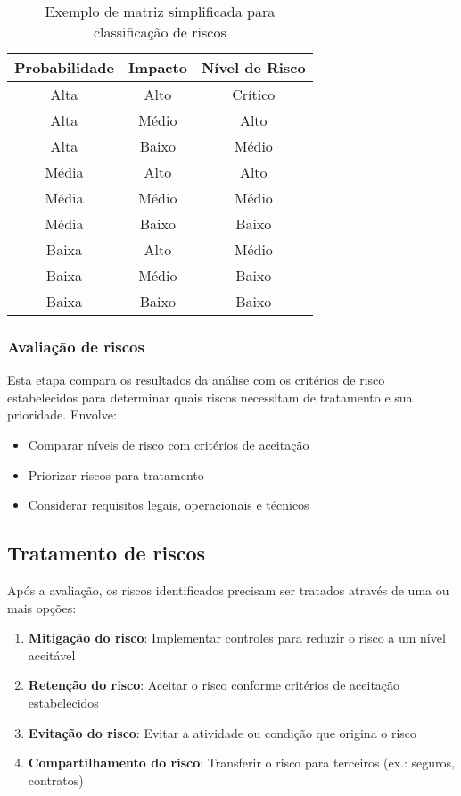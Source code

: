 \documentclass[12pt,a4paper]{report}
\begin{document}
\begin{table}[h]
\centering
\begin{tabular}{ccc}
\toprule
\textbf{Probabilidade} & \textbf{Impacto} & \textbf{Nível de Risco} \\
\midrule
Alta & Alto & Crítico \\
Alta & Médio & Alto \\
Alta & Baixo & Médio \\
Média & Alto & Alto \\
Média & Médio & Médio \\
Média & Baixo & Baixo \\
Baixa & Alto & Médio \\
Baixa & Médio & Baixo \\
Baixa & Baixo & Baixo \\
\bottomrule
\end{tabular}
\caption{Exemplo de matriz simplificada para classificação de riscos}
\end{table}

\subsubsection{Avaliação de riscos}

Esta etapa compara os resultados da análise com os critérios de risco estabelecidos para determinar quais riscos necessitam de tratamento e sua prioridade. Envolve:

\begin{itemize}
  \item Comparar níveis de risco com critérios de aceitação
  \item Priorizar riscos para tratamento
  \item Considerar requisitos legais, operacionais e técnicos
\end{itemize}

\subsection{Tratamento de riscos}

Após a avaliação, os riscos identificados precisam ser tratados através de uma ou mais opções:

\begin{enumerate}
  \item \textbf{Mitigação do risco}: Implementar controles para reduzir o risco a um nível aceitável
  \item \textbf{Retenção do risco}: Aceitar o risco conforme critérios de aceitação estabelecidos
  \item \textbf{Evitação do risco}: Evitar a atividade ou condição que origina o risco
  \item \textbf{Compartilhamento do risco}: Transferir o risco para terceiros (ex.: seguros, contratos)
\end{enumerate}
\end{document}
